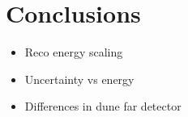 \section{Conclusions} \label{ME_EU}
\begin{mccorrection}
	\begin{itemize}
		\item Reco energy scaling
		\item Uncertainty vs energy
		\item Differences in dune far detector
	\end{itemize}
\end{mccorrection}
